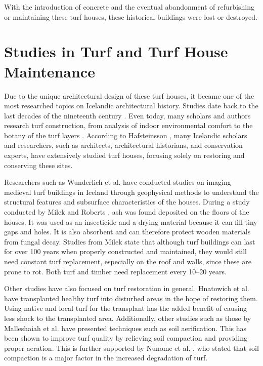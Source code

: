 With the introduction of concrete and the eventual abandonment of
refurbishing or maintaining these turf houses, these historical buildings were lost or destroyed.

\section{Studies in Turf and Turf House
Maintenance}

Due to the unique architectural design of these turf houses, it became
one of the most researched topics on Icelandic architectural history.
Studies date back to the last decades of the nineteenth century
\cite{ref05}. Even today, many scholars and authors research turf
construction, from analysis of indoor environmental comfort to the botany of the
turf layers \cite{ref07}. According to Hafsteinsson \cite{ref08}, many Icelandic
scholars and researchers, such as architects, architectural historians,
and conservation experts, have extensively studied turf houses, focusing
solely on restoring and conserving these sites.

Researchers such as Wunderlich et al. \cite{ref03} have conducted studies on
imaging medieval turf buildings in Iceland through geophysical methods
to understand the structural features and subsurface
characteristics of the houses. During a study conducted by Milek and
Roberts \cite{ref09}, ash was found deposited on the floors of the
houses. It was used as an insecticide and a drying material because it
can fill tiny gaps and holes. It is also absorbent and can therefore
protect wooden materials from fungal decay. Studies from Milek
\cite{ref10} state that although turf buildings can last for over 100 years
when properly constructed and maintained, they would still
need constant turf replacement, especially on the roof and walls,
since these are prone to rot. Both turf and timber need
replacement every 10--20 years.

Other studies have also focused on turf restoration in general.
Hnatowich et al. \cite{ref11} have transplanted healthy turf into disturbed areas
in the hope of restoring them. Using native and local turf for the transplant
has the added benefit of causing less shock to the transplanted area.
Additionally, other studies such as those by Malleshaiah et al.
\cite{ref12} have presented techniques such as soil aerification. This
has been shown to improve turf quality by relieving soil compaction and
providing proper aeration. This is further
supported by Nunome et al. \cite{ref13}, who stated that soil compaction is a
major factor in the increased degradation of turf.

